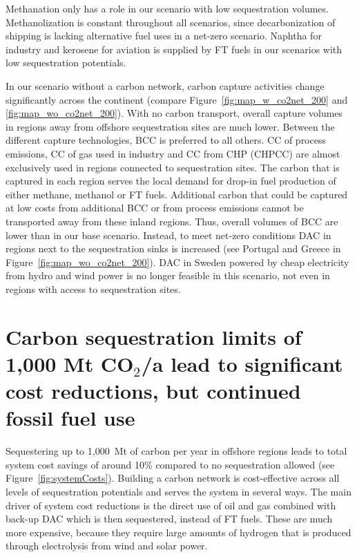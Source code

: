 \documentclass[10pt,5p,reversenotenum,lefttitle]{elsarticle}
\begin{document}
Methanation only has a role in our scenario with low sequestration volumes. Methanolization is constant throughout all scenarios, since decarbonization of shipping is lacking alternative fuel uses in a net-zero scenario. Naphtha for industry and kerosene for aviation is supplied by FT fuels in our scenarios with low sequestration potentials.

In our scenario without a carbon network, carbon capture activities change significantly across the continent (compare Figure~\ref{fig:map_w_co2net_200} and \ref{fig:map_wo_co2net_200}). With no carbon transport, overall capture volumes in regions away from offshore sequestration sites are much lower. Between the different capture technologies, BCC is preferred to all others. CC of process emissions, CC of gas used in industry and CC from CHP (CHPCC) are almost exclusively used in regions connected to sequestration sites. The carbon that is captured in each region serves the local demand for drop-in fuel production of either methane, methanol or FT fuels. Additional carbon that could be captured at low costs from additional BCC or from process emissions cannot be transported away from these inland regions. Thus, overall volumes of BCC are lower than in our base scenario. Instead, to meet net-zero conditions DAC in regions next to the sequestration sinks is increased (see Portugal and Greece in Figure~\ref{fig:map_wo_co2net_200}). DAC in Sweden powered by cheap electricity from hydro and wind power is no longer feasible in this scenario, not even in regions with access to sequestration sites.

\section*{Carbon sequestration limits of 1,000 Mt CO$_2$/a lead to significant cost reductions, but continued fossil fuel use}
\label{sec:sequestrationLimits}

Sequestering up to 1,000~Mt of carbon per year in offshore regions leads to total system cost savings of around 10\% compared to no sequestration allowed (see Figure~\ref{fig:systemCosts}). Building a carbon network is cost-effective across all levels of sequestration potentials and serves the system in several ways. The main driver of system cost reductions is the direct use of oil and gas combined with back-up DAC which is then sequestered, instead of FT fuels. These are much more expensive, because they require large amounts of hydrogen that is produced through electrolysis from wind and solar power.
\end{document}
